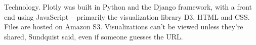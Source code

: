 Technology. Plotly was built in Python and the Django framework, with a front end using JavaScript -- primarily the visualization library D3, HTML and CSS. Files are hosted on Amazon S3. Visualizations can't be viewed unless they're shared, Sundquist said, even if someone guesses the URL.
